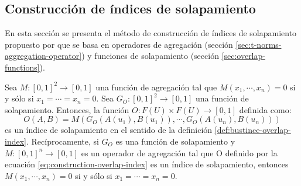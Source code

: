 \subsection{Construcción de índices de solapamiento}
En esta sección se presenta el método de construcción de índices de solapamiento propuesto por \cite{bustince2013overlap} que se basa en operadores de agregación (sección \ref{sec:t-norms-aggregation-operator}) y funciones de solapamiento (sección \ref{sec:overlap-functions}).
\begin{theorem}
Sea $M : [0,1]^{2} \rightarrow [0,1]$ una función de agregación tal que $M(x_{1},\cdots,x_{n}) = 0$ si y sólo si $x_{1} = \cdots = x_{n} = 0$. Sea $G_{O} : [0,1]^{2} \rightarrow [0,1]$ una función de solapamiento. Entonces, la función $O: F(U) \times F(U) \rightarrow [0,1]$ definida como:
\begin{equation}\label{eq:construction-overlap-index}
O(A,B) = M(G_{O}(A(u_{1}),B(u_{1})),\cdots,G_{O}(A(u_{n}),B(u_{n})))
\end{equation}
es un índice de solapamiento en el sentido de la definición \ref{def:bustince-overlap-index}. Recíprocamente, si $G_{O}$ es una función de solapamiento y $M:[0,1]^{n} \rightarrow [0,1]$ es un operador de agregación tal que O definido por la ecuación \ref{eq:construction-overlap-index} es un índice de solapamiento, entonces $M(x_{1},\cdots,x_{n}) = 0$ si y sólo si $x_{1} = \cdots = x_{n} = 0$.
\end{theorem}
